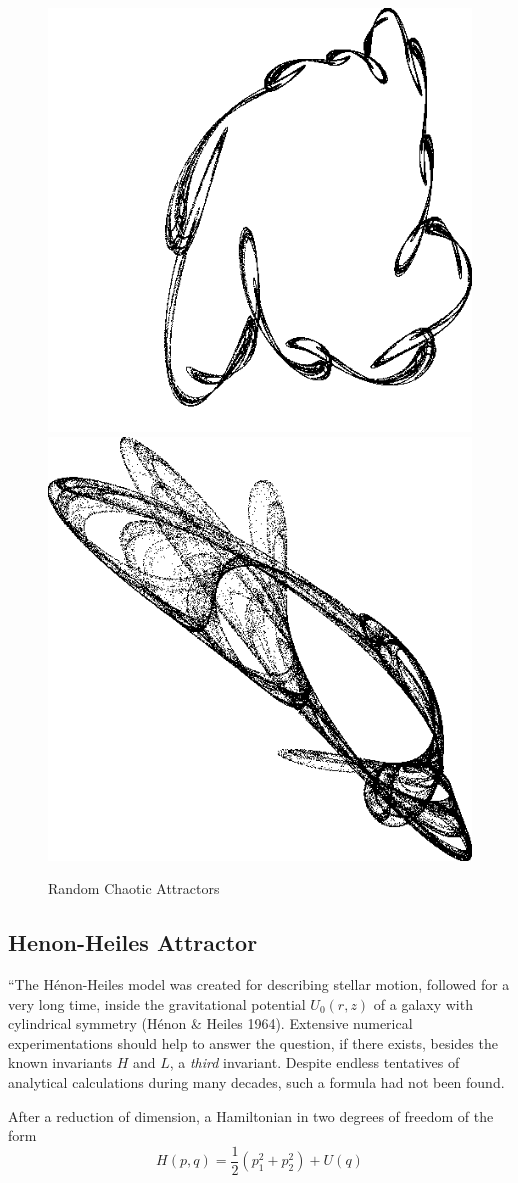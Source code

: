 \documentclass[12pt]{article}
\begin{document}
\begin{figure}[H]
    \includegraphics[width=0.47\linewidth]{Figures/random_attractors/862.png}
    \includegraphics[width=0.47\linewidth]{Figures/random_attractors/54966.png}
    \caption{Random Chaotic Attractors}
    \label{fig:random chaotic attractors2}
\end{figure}



\newpage

\subsection{Henon-Heiles Attractor}
``The H\'enon-Heiles model was created for describing stellar motion, followed for a very long time, inside the gravitational potential $U_0(r,z)$ of a galaxy with cylindrical symmetry (H\'enon \& Heiles 1964). Extensive numerical experimentations should help to answer the question, if there exists, besides the known invariants $H$ and $L$, a \textit{third} invariant. Despite endless tentatives of analytical calculations during many decades, such a formula had not been found.

After a reduction of dimension, a Hamiltonian in two degrees of freedom of the form
\begin{equation}\label{eq:heinon heiles hamiltonian}H(p,q) = \frac{1}{2} \left( p_1^2 + p_2^2 \right) + U(q)
\end{equation}
\end{document}
